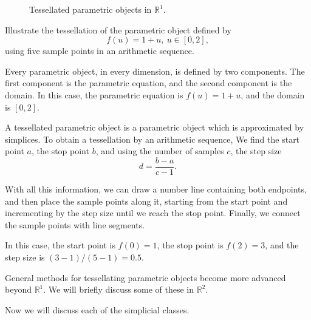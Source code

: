 \begin{figure}
    \centering
    \caption{Tessellated parametric objects in \(\mathbb{R}^{1}\).}
    \label{fig:affine-R1tessellation}
\end{figure}

\begin{example}
    Illustrate the tessellation of the parametric object defined by
    \[
        f(u) = 1+u,\ u\in[0,2],
    \]
    using five sample points in an arithmetic sequence.
\end{example}
\begin{solution}
    Every parametric object, in every dimension, is defined by two 
    components. The first component is the parametric equation, 
    and the second component is the domain. In this case, the 
    parametric equation is \(f(u) = 1+u\), and the domain is \([0,2]\). 

    A tessellated parametric object is a parametric object which is 
    approximated by simplices. To obtain a tessellation by an 
    arithmetic sequence, We find the start point \(a\), the stop point \(b\),
    and using the number of samples \(c\), the step size \[
        d = \frac{b-a}{c-1}.
    \]

    With all this information, we can draw a number line containing 
    both endpoints, and then place the sample points along it, starting 
    from the start point and incrementing by the step size until we reach the
    stop point. Finally, we connect the sample points with line segments.

    In this case, the start point is \(f(0) = 1\), the stop point is
    \(f(2) = 3\), and the step size is \((3-1)/(5-1) = 0.5\).
\end{solution}
\begin{remark}
    General methods for tessellating parametric objects become more
    advanced beyond \(\mathbb{R}^{1}\). We will briefly discuss some
    of these in \(\mathbb{R}^{2}\).
\end{remark}
Now we will discuss each of the simplicial classes.

